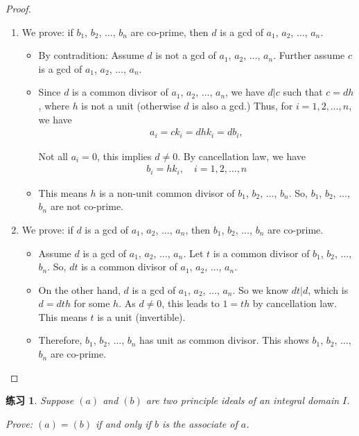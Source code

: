 \documentclass[utf8]{ctexbook}
\newtheorem{exercise}{练习}[section]
\begin{document}
\begin{proof}
\begin{enumerate}
\item{We prove: if $b_1$, $b_2$, $\ldots$, $b_n$ are co-prime, then $d$ is a gcd of $a_1$, $a_2$, $\ldots$, $a_n$.
\begin{itemize}
\item{By contradition: Assume $d$ is not a gcd of $a_1$, $a_2$, $\ldots$, $a_n$. Further assume $c$ is a gcd of $a_1$, $a_2$, $\ldots$, $a_n$.} 
\item{
Since $d$ is a common divisor of $a_1$, $a_2$, $\ldots$, $a_n$, we have $d | c$ such that $c = dh$, where $h$ is not a unit (otherwise $d$ is also a gcd.) Thus, for $i=1,2,\ldots, n$, we have
\begin{align*}
a_i = c k_i = d h k_i = d b_i, 
\end{align*}

Not all $a_i = 0$, this implies $d \neq 0$. By cancellation law, we have 
\begin{align*}
b_i = h k_i, \quad i = 1, 2, \ldots, n
\end{align*}
}
\item{This means $h$ is a non-unit common divisor of $b_1$, $b_2$, $\ldots$, $b_n$. So, $b_1$, $b_2$, $\ldots$, $b_n$ are not co-prime.}
\end{itemize}
}
\item{We prove: if $d$ is a gcd of $a_1$, $a_2$, $\ldots$, $a_n$, then $b_1$, $b_2$, $\ldots$, $b_n$ are co-prime.}
\begin{itemize}
\item{Assume $d$ is a gcd of $a_1$, $a_2$, $\ldots$, $a_n$. Let $t$ is a common divisor of $b_1$, $b_2$, $\ldots$, $b_n$. So, $dt$ is a common divisor of $a_1$, $a_2$, $\ldots$, $a_n$.}
\item{On the other hand, $d$ is a gcd of $a_1$, $a_2$, $\ldots$, $a_n$. So we know $dt | d$, which is $d = dt h$ for some $h$. As $d \neq 0 $, this leads to $1 = t h$ by cancellation law. This means $t$ is a unit (invertible). 
}
\item{Therefore, $b_1$, $b_2$, $\ldots$, $b_n$ has unit as common divisor. This shows $b_1$, $b_2$, $\ldots$, $b_n$ are co-prime.}
\end{itemize}
\end{enumerate}


\end{proof}

\begin{exercise}\label{exercise_3_2_2_two_principle_ideals_associate}
Suppose $(a)$ and $(b)$ are two principle ideals of an integral domain $I$.

Prove: $(a) =(b)$ if and only if $b$ is the associate of $a$.
\end{exercise}
\end{document}
